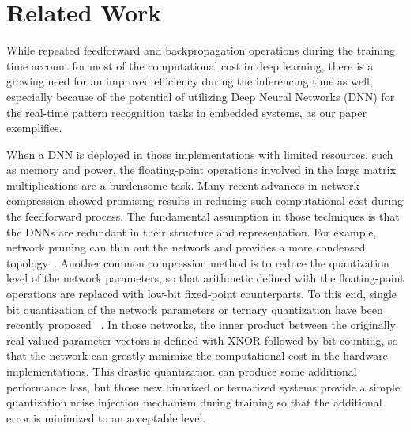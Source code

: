 \section{Related Work}

While repeated feedforward and backpropagation operations during
the training time account for most of the computational cost in
deep learning, there is a growing need for an improved efficiency
during the inferencing time as well, especially because of the
potential of utilizing Deep Neural Networks (DNN) for the real-time
pattern recognition tasks in embedded systems, as our paper
exemplifies.

When a DNN is deployed in those implementations with limited
resources, such as memory and power, the floating-point operations
involved in the large matrix multiplications are a burdensome task.
Many recent advances in network compression showed promising results
in reducing such computational cost during the feedforward
process. The fundamental assumption in those techniques is that the
DNNs are redundant in their structure and representation. For example,
network pruning can thin out the network and provides a more condensed
topology~\cite{han2015deep}.
Another common compression method is to reduce the
quantization level of the network parameters, so that arithmetic
defined with the floating-point operations are replaced with low-bit
fixed-point counterparts. To this end, single bit quantization of the
network parameters or ternary quantization have been recently proposed
~\cite{hwang2014fixed,soudry2014expectation,kim2016bitwise,rastegari2016xnor,hubara2016binarized,beauchamp2006embedded,govindu2004analysis}.
In those networks, the inner product between the
originally real-valued parameter vectors is defined with XNOR followed
by bit counting, so that the network can greatly minimize the
computational cost in the hardware implementations. This drastic
quantization can produce some additional performance loss, but those
new binarized or ternarized systems provide a simple quantization
noise injection mechanism during training so that the additional error
is minimized to an acceptable level.

